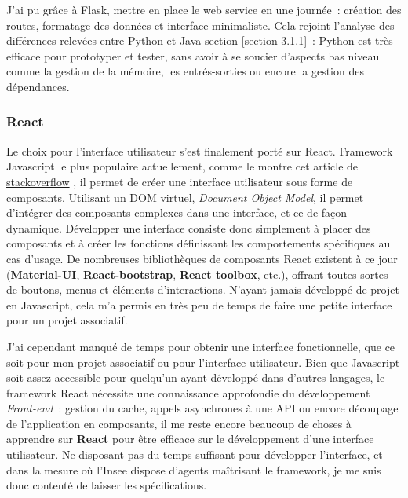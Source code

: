 J'ai pu grâce à Flask, mettre en place le web service en une journée~: création des routes, formatage des données et interface minimaliste. Cela rejoint l'analyse des différences relevées entre Python et Java section \ref{section 3.1.1}~: Python est très efficace pour prototyper et tester, sans avoir à se soucier d'aspects bas niveau comme la gestion de la mémoire, les entrés-sorties ou encore la gestion des dépendances.
\label{section 3.2.2 - Flask}

\subsubsection*{React}
Le choix pour l'interface utilisateur s'est finalement porté sur React. Framework Javascript le plus populaire actuellement, comme le montre cet article de \href{https://stackoverflow.blog/2018/01/11/brutal-lifecycle-javascript-frameworks/}{stackoverflow} \cite{stackoverflow-javascript}, il permet de créer une interface utilisateur sous forme de composants. Utilisant un DOM virtuel, \textit{Document Object Model}, il permet d'intégrer des composants complexes dans une interface, et ce de façon dynamique. Développer une interface consiste donc simplement à placer des composants et à créer les fonctions définissant les comportements spécifiques au cas d'usage. De nombreuses bibliothèques de composants React existent à ce jour (\textbf{Material-UI}, \textbf{React-bootstrap}, \textbf{React toolbox}, etc.), offrant toutes sortes de boutons, menus et éléments d'interactions. N'ayant jamais développé de projet en Javascript, cela m'a permis en très peu de temps de faire une petite interface pour un projet associatif.
\newline

J'ai cependant manqué de temps pour obtenir une interface fonctionnelle, que ce soit pour mon projet associatif ou pour l'interface utilisateur. Bien que Javascript soit assez accessible pour quelqu'un ayant développé dans d'autres langages, le framework React nécessite une connaissance approfondie du développement \textit{Front-end}~: gestion du cache, appels asynchrones à une API ou encore découpage de l'application en composants, il me reste encore beaucoup de choses à apprendre sur \textbf{React} pour être efficace sur le développement d'une interface utilisateur. Ne disposant pas du temps suffisant pour développer l'interface, et dans la mesure où l'Insee dispose d'agents maîtrisant le framework, je me suis donc contenté de laisser les spécifications.
\newline

